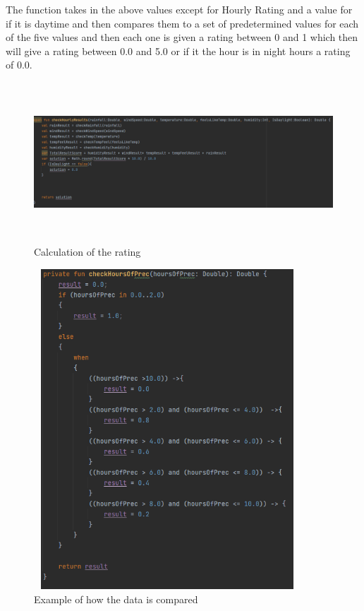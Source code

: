 The function takes in the above values except for Hourly Rating and a value for if it is daytime and then compares them to a set of predetermined values for each of the five values and then each one is given a rating between 0 and 1 which then will give a rating between 0.0 and 5.0 or if it the hour is in night hours a rating of 0.0.

\begin{figure}[H]
    \centering
    \includegraphics[width=16cm,height = 6cm]{img/DataComparison.PNG}
    \caption{Calculation of the rating}
    \label{fig:altas config}
\end{figure}

\begin{figure}[H]
    \centering
    \includegraphics[width=10cm,height = 12cm]{img/DataComparisonExample.PNG}
    \caption{Example of how the data is compared}
    \label{fig:altas config}
\end{figure}

